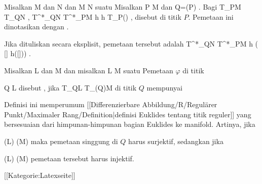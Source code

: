 {}
{

Misalkan
\mathkor {} {M} {dan} {N} {}
dan
\maabbdisp {\varphi} { M } { N
} {}
suatu
Misalkan
\mathkor {} {P \in M} {dan} {Q=\varphi(P)} {.}
Bagi
 { T_PM } { T_QN
} {}
,
\maabbeledisp {} { T^*_QN } { T^*_PM
} { h } { h \circ  T_P(\varphi)
} {,}
disebut  di titik $P$. Pemetaan ini dinotasikan dengan
.

}

Jika dituliskan secara eksplisit, pemetaan tersebut adalah
\maabbeledisp {} {T^*_QN} {T^*_PM
} {h} {( [\gamma] \mapsto h([\varphi \circ \gamma]))
} {.}

{}
{

Misalkan
\mathkor {} {L} {dan} {M} {}
dan misalkan
\maabbdisp {\varphi} { L } { M
} {}
suatu
Pemetaan $\varphi$ di titik

\mavergleichskette
{\vergleichskette
{ Q
}
{ \in }{ L
}
{  }{
}
{    }{
}
{   }{
}
}
{}{}{}
disebut
 {} {,}
jika
 { T_QL } { T_{\varphi(Q)}M
} {}
di titik $Q$ mempunyai

}

Definisi ini memperumum
[[Differenzierbare Abbildung/R/Regulärer Punkt/Maximaler Rang/Definition|definisi Euklides tentang titik reguler]]
yang bersesuaian dari himpunan-himpunan bagian Euklides ke manifold. Artinya, jika

\mavergleichskette
{\vergleichskette
{  (L)
}
{ \geq }{   (M)
}
{  }{
}
{    }{
}
{   }{
}
}
{}{}{}
maka pemetaan singgung di $Q$ harus surjektif, sedangkan jika

\mavergleichskette
{\vergleichskette
{  (L)
}
{ \leq }{   (M)
}
{  }{
}
{    }{
}
{   }{
}
}
{}{}{}
pemetaan tersebut harus injektif.

 [[Kategorie:Latexseite]]

